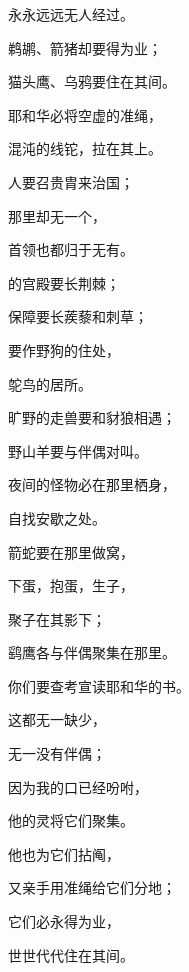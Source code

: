 {\par }{\Q 永永远远无人经过。
\par }{\Q {}鹈鹕、箭猪却要得为业；
\par }{\Q 猫头鹰、乌鸦要住在其间。
\par }{\Q 耶和华必将空虚的准绳，
\par }{\Q 混沌的线铊，拉在其上。
\par }{\Q {}人要召贵胄来治国；
\par }{\Q 那里却无一个，
\par }{\Q 首领也都归于无有。
\par }{\BB \par }{\Q {}的宫殿要长荆棘；
\par }{\Q 保障要长蒺藜和刺草；
\par }{\Q 要作野狗的住处，
\par }{\Q 鸵鸟的居所。
\par }{\Q {}旷野的走兽要和豺狼相遇；
\par }{\Q 野山羊要与伴偶对叫。
\par }{\Q 夜间的怪物必在那里栖身，
\par }{\Q 自找安歇之处。
\par }{\Q {}箭蛇要在那里做窝，
\par }{\Q 下蛋，抱蛋，生子，
\par }{\Q 聚子在其影下；
\par }{\Q 鹞鹰各与伴偶聚集在那里。
\par }{\BB \par }{\Q {}你们要查考宣读耶和华的书。
\par }{\Q 这都无一缺少，
\par }{\Q 无一没有伴偶；
\par }{\Q 因为我的口已经吩咐，
\par }{\Q 他的灵将它们聚集。
\par }{\Q {}他也为它们拈阄，
\par }{\Q 又亲手用准绳给它们分地；
\par }{\Q 它们必永得为业，
\par }{\Q 世世代代住在其间。

}
